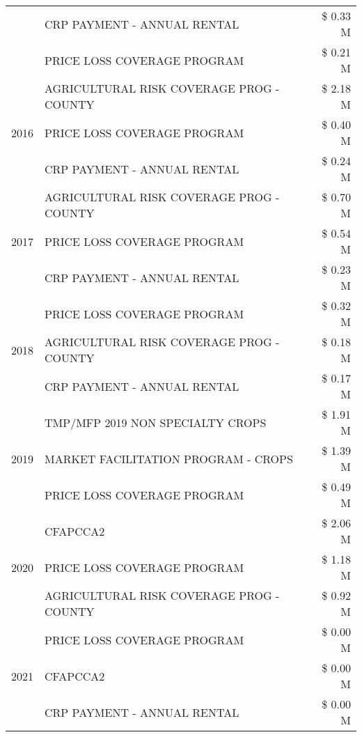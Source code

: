 \begin{tabular}{llr}
 & CRP PAYMENT - ANNUAL RENTAL & \$ 0.33 M \\
 & PRICE LOSS COVERAGE PROGRAM & \$ 0.21 M \\
\cline{1-3}
\multirow[t]{3}{*}{2016} & AGRICULTURAL RISK COVERAGE PROG - COUNTY & \$ 2.18 M \\
 & PRICE LOSS COVERAGE PROGRAM & \$ 0.40 M \\
 & CRP PAYMENT - ANNUAL RENTAL & \$ 0.24 M \\
\cline{1-3}
\multirow[t]{3}{*}{2017} & AGRICULTURAL RISK COVERAGE PROG - COUNTY & \$ 0.70 M \\
 & PRICE LOSS COVERAGE PROGRAM & \$ 0.54 M \\
 & CRP PAYMENT - ANNUAL RENTAL & \$ 0.23 M \\
\cline{1-3}
\multirow[t]{3}{*}{2018} & PRICE LOSS COVERAGE PROGRAM & \$ 0.32 M \\
 & AGRICULTURAL RISK COVERAGE PROG - COUNTY & \$ 0.18 M \\
 & CRP PAYMENT - ANNUAL RENTAL & \$ 0.17 M \\
\cline{1-3}
\multirow[t]{3}{*}{2019} & TMP/MFP 2019 NON SPECIALTY CROPS & \$ 1.91 M \\
 & MARKET FACILITATION PROGRAM - CROPS & \$ 1.39 M \\
 & PRICE LOSS COVERAGE PROGRAM & \$ 0.49 M \\
\cline{1-3}
\multirow[t]{3}{*}{2020} & CFAPCCA2 & \$ 2.06 M \\
 & PRICE LOSS COVERAGE PROGRAM & \$ 1.18 M \\
 & AGRICULTURAL RISK COVERAGE PROG - COUNTY & \$ 0.92 M \\
\cline{1-3}
\multirow[t]{3}{*}{2021} & PRICE LOSS COVERAGE PROGRAM & \$ 0.00 M \\
 & CFAPCCA2 & \$ 0.00 M \\
 & CRP PAYMENT - ANNUAL RENTAL & \$ 0.00 M \\
\cline{1-3}
\bottomrule
\end{tabular}
